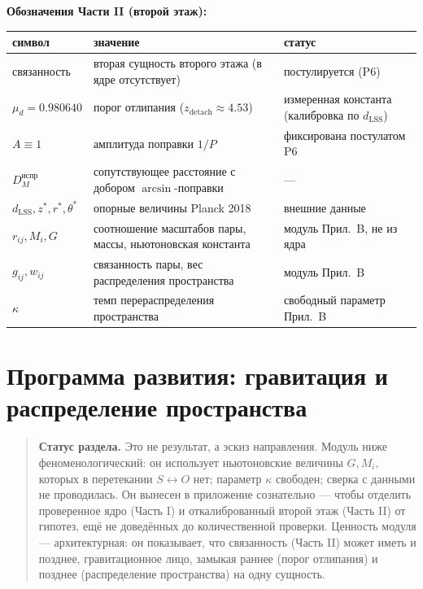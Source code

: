 \documentclass{article}
\begin{document}
\medskip
\noindent\textbf{Обозначения Части II (второй этаж):}

\begin{center}
\footnotesize
\setlength{\tabcolsep}{4pt}
\begin{tabularx}{\textwidth}{@{}l >{\raggedright\arraybackslash}X >{\raggedright\arraybackslash}X@{}}
\toprule
\textbf{символ} & \textbf{значение} & \textbf{статус} \\
\midrule
связанность & вторая сущность второго этажа (в ядре отсутствует) & постулируется (P6) \\
$\mu_d = 0.980640$ & порог отлипания ($z_{\text{detach}} \approx 4.53$) & измеренная константа (калибровка по $d_{\text{LSS}}$) \\
$A \equiv 1$ & амплитуда поправки $1/P$ & фиксирована постулатом P6 \\
$D_M^{\text{испр}}$ & сопутствующее расстояние с добором $\arcsin$-поправки & --- \\
$d_{\text{LSS}}, z^*, r^*, \theta^*$ & опорные величины Planck 2018 & внешние данные \\
$r_{ij}, M_i, G$ & соотношение масштабов пары, массы, ньютоновская константа & модуль Прил.\ B, не из ядра \\
$g_{ij}, w_{ij}$ & связанность пары, вес распределения пространства & модуль Прил.\ B \\
$\kappa$ & темп перераспределения пространства & свободный параметр Прил.\ B \\
\bottomrule
\end{tabularx}
\end{center}

\section{Программа развития: гравитация и распределение пространства}

\begin{quote}
\textbf{Статус раздела.} Это не результат, а эскиз направления. Модуль ниже феноменологический: он использует ньютоновские величины $G, M_i$, которых в перетекании $S \leftrightarrow O$ нет; параметр $\kappa$ свободен; сверка с данными не проводилась. Он вынесен в приложение сознательно --- чтобы отделить проверенное ядро (Часть I) и откалиброванный второй этаж (Часть II) от гипотез, ещё не доведённых до количественной проверки. Ценность модуля --- архитектурная: он показывает, что связанность (Часть II) может иметь и позднее, гравитационное лицо, замыкая раннее (порог отлипания) и позднее (распределение пространства) на одну сущность.
\end{quote}
\end{document}
